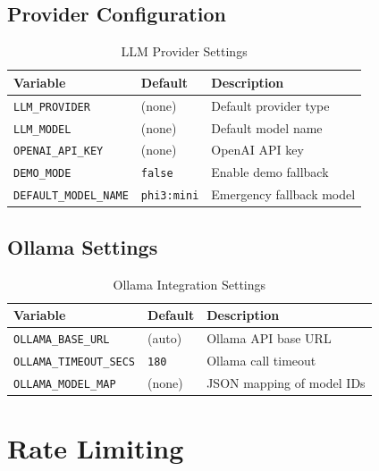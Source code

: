 \documentclass[a4paper,twoside]{sapthesis}
\begin{document}
\subsection{Provider Configuration}

\begin{table}[ht]
\centering
\caption{LLM Provider Settings}
\label{tab:config-llm-provider}
\small
\begin{tabularx}{\textwidth}{llX}
    \hline
    \textbf{Variable} & \textbf{Default} & \textbf{Description} \\
    \hline
    \texttt{LLM\_PROVIDER} & (none) & Default provider type \\
    \texttt{LLM\_MODEL} & (none) & Default model name \\
    \texttt{OPENAI\_API\_KEY} & (none) & OpenAI API key \\
    \texttt{DEMO\_MODE} & \texttt{false} & Enable demo fallback \\
    \texttt{DEFAULT\_MODEL\_NAME} & \texttt{phi3:mini} & Emergency fallback model \\
    \hline
\end{tabularx}
\end{table}

\subsection{Ollama Settings}

\begin{table}[ht]
\centering
\caption{Ollama Integration Settings}
\label{tab:config-ollama}
\small
\begin{tabularx}{\textwidth}{llX}
    \hline
    \textbf{Variable} & \textbf{Default} & \textbf{Description} \\
    \hline
    \texttt{OLLAMA\_BASE\_URL} & (auto) & Ollama API base URL \\
    \texttt{OLLAMA\_TIMEOUT\_SECS} & \texttt{180} & Ollama call timeout \\
    \texttt{OLLAMA\_MODEL\_MAP} & (none) & JSON mapping of model IDs \\
    \hline
\end{tabularx}
\end{table}

\section{Rate Limiting}
\label{app:config:ratelimit}
\end{document}
